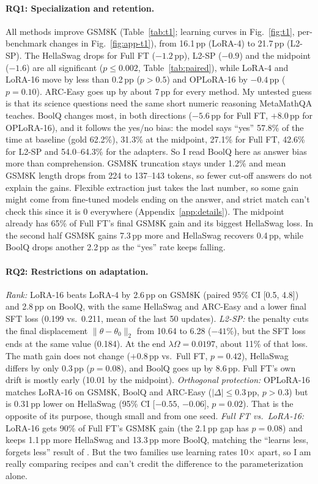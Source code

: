 \documentclass{article}
\newcommand{\pp}{\,pp}
\begin{document}
\paragraph{RQ1: Specialization and retention.} All methods improve GSM8K (Table~\ref{tab:t1}; learning curves in Fig.~\ref{fig:t1}, per-benchmark changes in Fig.~\ref{fig:app-t1}), from 16.1\pp{} (LoRA-4) to 21.7\pp{} (L2-SP). The HellaSwag drops for Full FT ($-1.2$\pp), L2-SP ($-0.9$) and the midpoint ($-1.6$) are all significant ($p\le0.002$, Table~\ref{tab:paired}), while LoRA-4 and LoRA-16 move by less than 0.2\pp{} ($p>0.5$) and OPLoRA-16 by $-0.4$\pp{} ($p=0.10$). ARC-Easy goes up by about 7\pp{} for every method. My untested guess is that its science questions need the same short numeric reasoning MetaMathQA teaches. BoolQ changes most, in both directions ($-5.6$\pp{} for Full FT, $+8.0$\pp{} for OPLoRA-16), and it follows the yes/no bias: the model says ``yes'' 57.8\% of the time at baseline (gold 62.2\%), 31.3\% at the midpoint, 27.1\% for Full FT, 42.6\% for L2-SP and 54.0--64.3\% for the adapters. So I read BoolQ here as answer bias more than comprehension. GSM8K truncation stays under 1.2\% and mean GSM8K length drops from 224 to 137--143 tokens, so fewer cut-off answers do not explain the gains. Flexible extraction just takes the last number, so some gain might come from fine-tuned models ending on the answer, and strict match can't check this since it is 0 everywhere (Appendix~\ref{app:details}). The midpoint already has 65\% of Full FT's final GSM8K gain and its biggest HellaSwag loss. In the second half GSM8K gains 7.3\pp{} more and HellaSwag recovers 0.4\pp, while BoolQ drops another 2.2\pp{} as the ``yes'' rate keeps falling.

\paragraph{RQ2: Restrictions on adaptation.} \emph{Rank:} LoRA-16 beats LoRA-4 by 2.6\pp{} on GSM8K (paired 95\% CI [0.5, 4.8]) and 2.8\pp{} on BoolQ, with the same HellaSwag and ARC-Easy and a lower final SFT loss (0.199 vs.\ 0.211, mean of the last 50 updates). \emph{L2-SP:} the penalty cuts the final displacement $\|\theta-\theta_0\|_2$ from 10.64 to 6.28 ($-41\%$), but the SFT loss ends at the same value (0.184). At the end $\lambda\Omega=0.0197$, about 11\% of that loss. The math gain does not change ($+0.8$\pp{} vs.\ Full FT, $p=0.42$), HellaSwag differs by only 0.3\pp{} ($p=0.08$), and BoolQ goes up by 8.6\pp. Full FT's own drift is mostly early (10.01 by the midpoint). \emph{Orthogonal protection:} OPLoRA-16 matches LoRA-16 on GSM8K, BoolQ and ARC-Easy ($|\Delta|\le0.3$\pp, $p>0.3$) but is 0.31\pp{} lower on HellaSwag (95\% CI [$-0.55$, $-0.06$], $p=0.02$). That is the opposite of its purpose, though small and from one seed. \emph{Full FT vs.\ LoRA-16:} LoRA-16 gets 90\% of Full FT's GSM8K gain (the 2.1\pp{} gap has $p=0.08$) and keeps 1.1\pp{} more HellaSwag and 13.3\pp{} more BoolQ, matching the ``learns less, forgets less'' result of \citet{biderman2024lora}. But the two families use learning rates 10$\times$ apart, so I am really comparing recipes and can't credit the difference to the parameterization alone.
\end{document}
